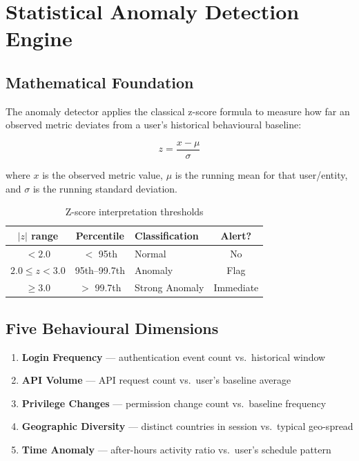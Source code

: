 \documentclass[12pt,a4paper]{article}
\begin{document}
\section{Statistical Anomaly Detection Engine}

\subsection{Mathematical Foundation}

The anomaly detector applies the classical z-score formula to measure how far an observed
metric deviates from a user's historical behavioural baseline:

\begin{equation}
z = \frac{x - \mu}{\sigma}
\label{eq:zscore}
\end{equation}

\noindent where $x$ is the observed metric value, $\mu$ is the running mean for that
user/entity, and $\sigma$ is the running standard deviation.

\begin{table}[H]
\centering
\caption{Z-score interpretation thresholds}
\begin{tabular}{cclc}
\toprule
\textbf{$|z|$ range} & \textbf{Percentile} & \textbf{Classification} & \textbf{Alert?} \\
\midrule
$< 2.0$           & $<$ 95th  & Normal         & No \\
$2.0 \leq z < 3.0$ & 95th--99.7th & Anomaly   & Flag \\
$\geq 3.0$        & $>$ 99.7th & Strong Anomaly & Immediate \\
\bottomrule
\end{tabular}
\end{table}

\subsection{Five Behavioural Dimensions}

\begin{enumerate}
  \item \textbf{Login Frequency} --- authentication event count vs.\ historical window
  \item \textbf{API Volume} --- API request count vs.\ user's baseline average
  \item \textbf{Privilege Changes} --- permission change count vs.\ baseline frequency
  \item \textbf{Geographic Diversity} --- distinct countries in session vs.\ typical geo-spread
  \item \textbf{Time Anomaly} --- after-hours activity ratio vs.\ user's schedule pattern
\end{enumerate}
\end{document}
